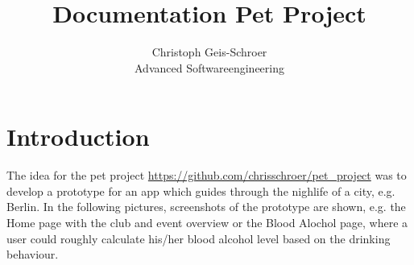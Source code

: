 \documentclass[12pt]{article}
\title{Documentation Pet Project}%
\author{Christoph Geis-Schroer\\ %
Advanced Softwareengineering} %
\begin{document}
\maketitle

\section{Introduction}

The idea for the pet project \url{https://github.com/chrisschroer/pet_project} was to develop a prototype for an app which guides through the nighlife of a city, e.g. Berlin. In the following pictures, screenshots of the prototype are shown, e.g. the Home page with the club and event overview or the Blood Alochol page, where a user could roughly calculate his/her blood alcohol level based on the drinking behaviour.
\end{document}
